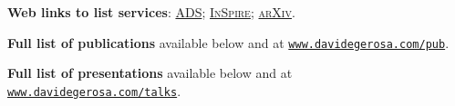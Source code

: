 \documentclass[a4paper]{moderncv}
\begin{document}
\textcolor{mark_color}{\textbf{Web links to list services}}:
\href{https://ui.adsabs.harvard.edu/search/fq=%7B!type%3Daqp%20v%3D%24fq_doctype%7D&fq_doctype=(doctype%3A%22misc%22%20OR%20doctype%3A%22inproceedings%22%20OR%20doctype%3A%22article%22%20OR%20doctype%3A%22eprint%22)&q=%20author%3A%22Gerosa%2C%20Davide%22&sort=citation_count%20desc%2C%20bibcode%20desc&p_=0}{\textsc{ADS}};
\href{http://inspirehep.net/search?ln=en&ln=en&p=exactauthor%3AD.Gerosa.1&of=hb&action_search=Search&sf=&so=d&rm=citation&rg=25&sc=0}{\textsc{InSpire}};
\href{http://arxiv.org/a/gerosa_d_1.html}{\textsc{arXiv}}.

\textbf{Full list of publications} available below and at \href{http://www.davidegerosa.com/pub}{\texttt{www.davidegerosa.com/pub}}.
\vspace{0.2cm}


\textbf{Full list of presentations} available below and at \href{http://www.davidegerosa.com/talks}{\texttt{www.davidegerosa.com/talks}}.
\end{document}
